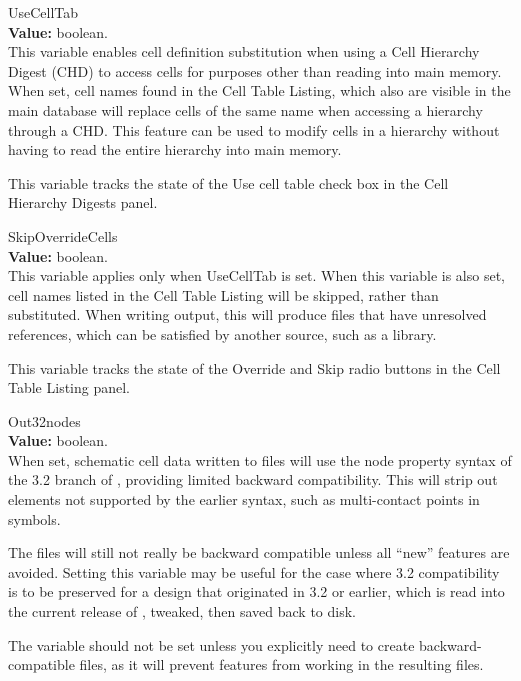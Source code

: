 \begin{description}
\item{\et UseCellTab}\\
{\bf Value:} boolean.\\
This variable enables cell definition substitution when using a Cell
Hierarchy Digest (CHD) to access cells for purposes other than reading
into main memory.  When set, cell names found in the {\cb Cell Table
Listing}, which also are visible in the main database will replace
cells of the same name when accessing a hierarchy through a CHD.  This
feature can be used to modify cells in a hierarchy without having to
read the entire hierarchy into main memory.

This variable tracks the state of the {\cb Use cell table} check box
in the {\cb Cell Hierarchy Digests} panel.

\item{\et SkipOverrideCells}\\
{\bf Value:} boolean.\\
This variable applies only when {\et UseCellTab} is set.  When this
variable is also set, cell names listed in the {\cb Cell Table
Listing} will be skipped, rather than substituted.  When writing
output, this will produce files that have unresolved references, which
can be satisfied by another source, such as a library.

This variable tracks the state of the {\cb Override} and {\cb Skip}
radio buttons in the {\cb Cell Table Listing} panel.

\item{\et Out32nodes}\\
{\bf Value:} boolean.\\
When set, schematic cell data written to files will use the {\et node}
property syntax of the 3.2 branch of {\Xic}, providing limited
backward compatibility.  This will strip out elements not supported by
the earlier syntax, such as multi-contact points in symbols.

The files will still not really be backward compatible unless all
``new'' features are avoided.  Setting this variable may be useful for
the case where 3.2 compatibility is to be preserved for a design that
originated in 3.2 or earlier, which is read into the current release
of {\Xic}, tweaked, then saved back to disk.

The variable should not be set unless you explicitly need to create
backward-compatible files, as it will prevent features from working in
the resulting files.


\end{description}
